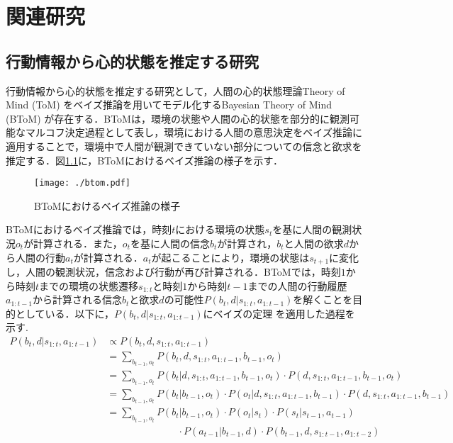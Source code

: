 \chapter{関連研究}

\section{行動情報から心的状態を推定する研究}
\par
行動情報から心的状態を推定する研究として，人間の心的状態理論Theory of Mind (ToM) \cite{子安増生1997心の理論}をベイズ推論を用いてモデル化するBayesian Theory of Mind (BToM) \cite{baker2011bayesian}が存在する．BToMは，環境の状態や人間の心的状態を部分的に観測可能なマルコフ決定過程として表し，環境における人間の意思決定をベイズ推論に適用することで，環境中で人間が観測できていない部分についての信念と欲求を推定する．図\ref{fig:btom}に，BToMにおけるベイズ推論の様子を示す．
\begin{figure}[htbp]
  \begin{center}
    \texttt{[image: ./btom.pdf]}
    \caption{BToMにおけるベイズ推論の様子}
    \label{fig:btom}
  \end{center}
\end{figure}
BToMにおけるベイズ推論では，時刻$t$における環境の状態$s_{t}$を基に人間の観測状況$o_{t}$が計算される．また，$o_{t}$を基に人間の信念$b_{t}$が計算され，$b_{t}$と人間の欲求$d$から人間の行動$a_{t}$が計算される．$a_{t}$が起こることにより，環境の状態は$s_{t+1}$に変化し，人間の観測状況，信念および行動が再び計算される．BToMでは，時刻$1$から時刻$t$までの環境の状態遷移$s_{1:t}$と時刻$1$から時刻$t-1$までの人間の行動履歴$a_{1:t-1}$から計算される信念$b_t$と欲求$d$の可能性$P(b_t,d|s_{1:t},a_{1:t-1})$を解くことを目的としている．以下に，$P(b_t,d|s_{1:t},a_{1:t-1})$にベイズの定理 \cite{ベイズ}を適用した過程を示す.
\begin{equation}
  \begin{split}
  \label{btom}
  P(b_t,d|s_{1:t},a_{1:t-1}) &\propto P(b_t,d,s_{1:t},a_{1:t-1})\\
  &= \sum_{b_{t-1},o_t}P(b_t,d,s_{1:t},a_{1:t-1},b_{t-1},o_t)\\
  &= \sum_{b_{t-1},o_t}P(b_t|d,s_{1:t},a_{1:t-1},b_{t-1},o_t)\cdot P(d,s_{1:t},a_{1:t-1},b_{t-1},o_t)\\
  &= \sum_{b_{t-1},o_t}P(b_t|b_{t-1},o_t)\cdot P(o_t|d,s_{1:t},a_{1:t-1},b_{t-1})\cdot P(d,s_{1:t},a_{1:t-1},b_{t-1})\\
  &= \sum_{b_{t-1},o_t}P(b_t|b_{t-1},o_t)\cdot P(o_t|s_t)\cdot P(s_t|s_{t-1},a_{t-1})\\
  &\hspace{3cm} \cdot P(a_{t-1}|b_{t-1},d)\cdot P(b_{t-1},d,s_{1:t-1},a_{1:t-2})\\
  \end{split}
\end{equation}

